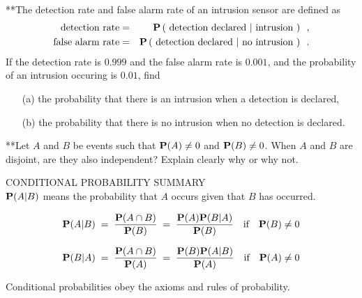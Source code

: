 \begin{ExerciseList}
\Exercise
{**}The detection rate and false alarm rate of an intrusion sensor are defined as
\begin{eqnarray*}
\text{detection rate} &=& \mathbf{P} \left( \text{ detection declared } | \text{ intrusion } \right) \enspace ,\\
\text{false alarm rate} &=& \mathbf{P} \left( \text{ detection declared } | \text{ no intrusion } \right) \enspace .
\end{eqnarray*}
If the detection rate is $0.999$ and the false alarm rate is $0.001$, and the probability of an intrusion occuring is $0.01$, find
\begin{itemize}
\item[(a)] the probability that there is an intrusion when a detection is declared,
\item[(b)] the probability that there is no intrusion when no detection is declared.
\end{itemize}

\Exercise
{**}Let $A$ and $B$ be events such that $\mathbf{P}(A) \neq 0$ and $\mathbf{P}(B) \neq 0$.  
When $A$ and $B$ are disjoint, are they also independent?  
Explain clearly why or why not.

\end{ExerciseList}

\begin{framed}
CONDITIONAL PROBABILITY SUMMARY\\

$\mathbf{P}(A|B)$ means the probability that $A$ occurs given that $B$ has
occurred.

$$\mathbf{P}(A|B)\;=\;\frac{\mathbf{P}(A\cap B)}{\mathbf{P}(B)}\;=\;\frac{\mathbf{P}(A)\mathbf{P}(B|A)}{\mathbf{P}(B)}\quad \textrm{if}\quad \mathbf{P}(B)\neq0$$

$$\mathbf{P}(B|A)\;=\;\frac{\mathbf{P}(A\cap B)}{\mathbf{P}(A)}\;=\;\frac{\mathbf{P}(B)\mathbf{P}(A|B)}{\mathbf{P}(A)}\quad \textrm{if}\quad \mathbf{P}(A)\neq 0$$

Conditional probabilities obey the axioms and rules of probability.
\end{framed}

